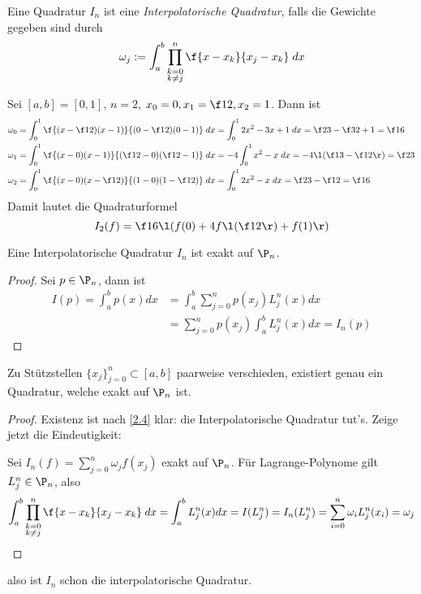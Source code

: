 \documentclass[a4paper,11pt]{scrartcl}
\begin{document}
\begin{df}
	\label{2.3}
	Eine Quadratur $I_n$ ist eine \emph{Interpolatorische Quadratur}, falls die Gewichte gegeben sind durch 
	\[
		\omega_j := \int_a^b \prod_{\substack{k=0\\k\neq j}}^n \f {x-x_k}{x_j-x_k} \;dx
	\]
\end{df}

\begin{ex*}
	Sei $[a,b] = [0,1]$, $n=2$, $x_0=0, x_1=\f 12, x_2 = 1$.
	Dann ist
	\begin{align*}
		\omega_0 &= \int_0^1 \f {(x-\f 12) (x-1)}{(0-\f 12)(0-1)} \; dx = \int_0^1 2x^2 - 3x+1 \; dx = \f 23 - \f 32 + 1 = \f 16 \\
		\omega_1 &= \int_0^1 \f {(x-0)(x-1)}{(\f 12 - 0)(\f 12 -1)} \; dx = -4 \int_0^1x^2 - x \; dx = -4 \l( \f 13 - \f 12 \r) = \f 23 \\
		\omega_2 &= \int_0^1 \f {(x-0)(x-\f 12)}{(1-0)(1-\f 12)} \; dx = \int_0^1 2x^2 -x \; dx = \f 23 - \f 12 = \f 16
	\end{align*}
	Damit lautet die Quadraturformel
	\[
		I_2(f) = \f 16 \l( f(0) + 4f\l(\f 12\r) + f(1)\r)
	\]
\end{ex*}

\begin{st}
	\label{2.4}
	Eine Interpolatorische Quadratur $I_n$ ist exakt auf $\P_n$.
	\begin{proof}
		Sei $p\in \P_n$, dann ist
		\begin{align*}
			I(p) = \int_a^b p(x) dx &= \int_a^b \sum_{j=0}^n p(x_j) L_j^n(x) dx \\
			&= \sum_{j=0}^n p(x_j) \int_a^b L_j^n(x) dx = I_n(p)
		\end{align*}
	\end{proof}
\end{st}

\begin{st}
	\label{2.5}
	Zu Stützstellen $\{x_j\}_{j=0}^n \subset [a,b]$ paarweise verschieden, existiert genau ein Quadratur, welche exakt auf $\P_n$ ist.
	\begin{proof}
		Existenz ist nach \ref{2.4} klar: die Interpolatorische Quadratur tut's.
		Zeige jetzt die Eindeutigkeit:

		Sei $I_n(f) = \sum_{j=0}^n \omega_j f(x_j)$ exakt auf $\P_n$.
		Für Lagrange-Polynome gilt $L_j^n \in \P_n$, also
		\begin{align*}
			\int_{a}^b \prod_{\substack{k=0\\k\neq j}}^n \f {x-x_k}{x_j-x_k} \; dx 
			= \int_a^b L_j^n (x) dx = I(L_j^n) = I_n(L_j^n) = \sum_{i=0}^n \omega_i L_j^n(x_i) = \omega_j
		\end{align*}
	\end{proof}
	also ist $I_n$ schon die interpolatorische Quadratur.
\end{st}
\end{document}
